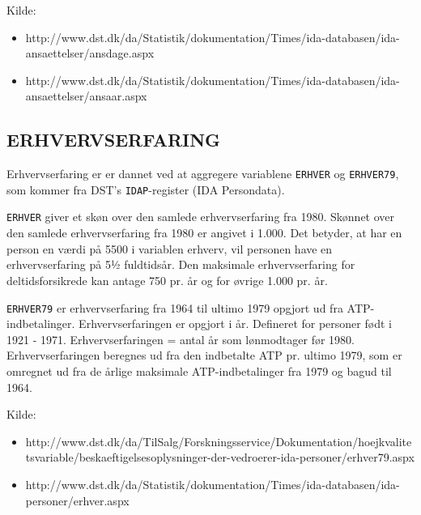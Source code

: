 %
Kilde:
\begin{itemize}
   \item  http://www.dst.dk/da/Statistik/dokumentation/Times/ida-databasen/ida-ansaettelser/ansdage.aspx
   \item http://www.dst.dk/da/Statistik/dokumentation/Times/ida-databasen/ida-ansaettelser/ansaar.aspx
\end{itemize}


\subsection{ERHVERVSERFARING \label{}}

Erhvervserfaring er er dannet ved at aggregere variablene \texttt{ERHVER} og \texttt{ERHVER79}, som kommer fra DST's \texttt{IDAP}-register (IDA Persondata).

\texttt{ERHVER} giver et skøn over den samlede erhvervserfaring fra 1980. Skønnet over den samlede erhvervserfaring fra 1980 er angivet i 1.000. Det betyder, at har en person en værdi på 5500 i variablen erhverv, vil personen have en erhvervserfaring på 5½ fuldtidsår. Den maksimale erhvervserfaring for deltidsforsikrede kan antage 750 pr. år og for øvrige 1.000 pr. år.

\texttt{ERHVER79} er erhvervserfaring fra 1964 til ultimo 1979 opgjort ud fra ATP-indbetalinger. Erhvervserfaringen er opgjort i år. Defineret for personer født i 1921 - 1971. Erhvervserfaringen = antal år som lønmodtager før 1980. Erhvervserfaringen beregnes ud fra den indbetalte ATP pr. ultimo 1979, som er omregnet ud fra de årlige maksimale ATP-indbetalinger fra 1979 og bagud til 1964.

Kilde:
\begin{itemize} [topsep=6pt,itemsep=-1ex]
  \item http://www.dst.dk/da/TilSalg/Forskningsservice/Dokumentation/hoejkvalitetsvariable/beskaeftigelsesoplysninger-der-vedroerer-ida-personer/erhver79.aspx
  \item http://www.dst.dk/da/Statistik/dokumentation/Times/ida-databasen/ida-personer/erhver.aspx
\end{itemize}



